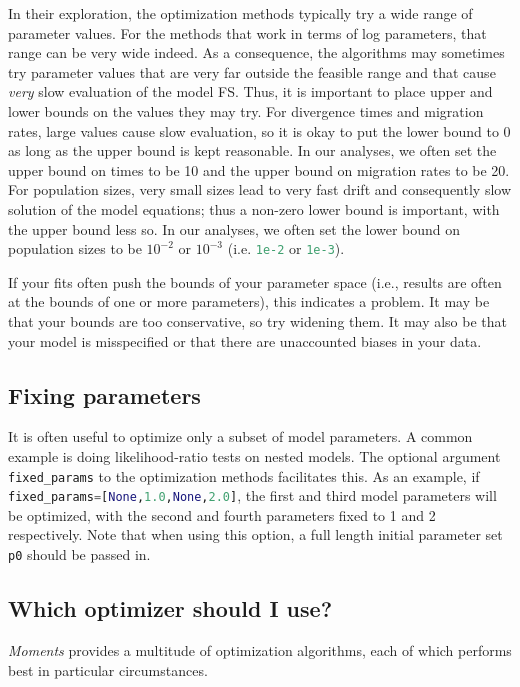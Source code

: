 \documentclass[12pt]{article}
\makeatletter
\newcommand{\py}[1]{\lstinline[breaklines=true,language=Python, showstringspaces=False]@#1@}
\makeatother
\begin{document}
In their exploration, the optimization methods typically try a wide range of parameter values.
For the methods that work in terms of log parameters, that range can be very wide indeed.
As a consequence, the algorithms may sometimes try parameter values that are very far outside the feasible range and that cause \emph{very} slow evaluation of the model FS.
Thus, it is important to place upper and lower bounds on the values they may try.
For divergence times and migration rates, large values cause slow evaluation, so it is okay to put the lower bound to 0 as long as the upper bound is kept reasonable.
In our analyses, we often set the upper bound on times to be 10 and the upper bound on migration rates to be 20.
For population sizes, very small sizes lead to very fast drift and consequently slow solution of the model equations; thus a non-zero lower bound is important, with the upper bound less so.
In our analyses, we often set the lower bound on population sizes to be $10^{-2}$ or $10^{-3}$ (i.e. \py{1e-2} or \py{1e-3}).

If your fits often push the bounds of your parameter space (i.e., results are often at the bounds of one or more parameters), this indicates a problem.
It may be that your bounds are too conservative, so try widening them.
It may also be that your model is misspecified or that there are unaccounted biases in your data.

\subsection{Fixing parameters}

It is often useful to optimize only a subset of model parameters.
A common example is doing likelihood-ratio tests on nested models.
The optional argument \py{fixed_params} to the optimization methods facilitates this.
As an example, if \py{fixed_params=[None,1.0,None,2.0]}, the first and third model parameters will be optimized, with the second and fourth parameters fixed to 1 and 2 respectively.
Note that when using this option, a full length initial parameter set \py{p0} should be passed in.

\subsection{Which optimizer should I use?}\label{sec:which_optimizer}

\textit{Moments} provides a multitude of optimization algorithms, each of which performs best in particular circumstances.
\end{document}
